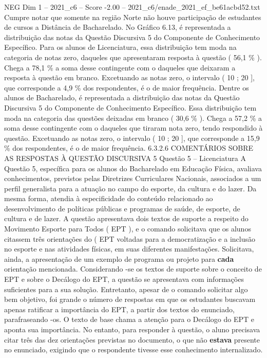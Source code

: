 \begin{textsample}{NEG Dim 1 – 2021\_c6 – Score -2.00 – 2021\_c6/enade\_2021\_ef\_be61acbd52.txt}
Cumpre notar que somente na região Norte não houve participação de estudantes de cursos a Distância de Bacharelado.
No Gráfico 6.13, é representada a distribuição das notas da Questão Discursiva 5 do Componente de Conhecimento Específico.
Para os alunos de Licenciatura, essa distribuição tem moda na categoria de notas zero, daqueles que apresentaram resposta à questão ( 56,1 \% ).
Chega a 78,1 \% a soma desse contingente com o daqueles que deixaram a resposta à questão em branco.
Excetuando as notas zero, o intervalo ( 10 ; 20 ], que corresponde a 4,9 \% dos respondentes, é o de maior frequência.
Dentre os alunos de Bacharelado, é representada a distribuição das notas da Questão Discursiva 5 do Componente de Conhecimento Específico.
Essa distribuição tem moda na categoria das questões deixadas em branco ( 30,6 \% ).
Chega a 57,2 \% a soma desse contingente com o daqueles que tiraram nota zero, tendo respondido à questão.
Excetuando as notas zero, o intervalo ( 10 ; 20 ], que corresponde a 15,9 \% dos respondentes, é o de maior frequência. 6.3.2.6 COMENTÁRIOS SOBRE AS RESPOSTAS À QUESTÃO DISCURSIVA 5 Questão 5 – Licenciatura A Questão 5, específica para os alunos do Bacharelado em Educação Física, avaliava conhecimentos, previstos pelas Diretrizes Curriculares Nacionais, associados a um perfil generalista para a atuação no campo do esporte, da cultura e do lazer.
Da mesma forma, atendia à especificidade do conteúdo relacionado ao desenvolvimento de políticas públicas e programas de saúde, de esporte, de cultura e de lazer.
A questão apresentava dois textos de suporte a respeito do Movimento Esporte para Todos ( EPT ), e o comando solicitava que os alunos citassem três orientações do ( EPT voltadas para a democratização e a inclusão no esporte e nas atividades físicas, em suas diferentes manifestações.
Solicitava, ainda, a apresentação de um exemplo de programa ou projeto para \textbf{cada} orientação mencionada.
Considerando -se os textos de suporte sobre o conceito de EPT e sobre o Decálogo do EPT, a questão se apresentava com informações suficientes para a sua solução.
Entretanto, apesar de o comando solicitar algo bem objetivo, foi grande o número de respostas em que os estudantes buscavam apenas ratificar a importância do EPT, a partir dos textos do enunciado, parafraseando -os.
O texto de base chama a atenção para o Decálogo do EPT e aponta sua importância.
No entanto, para responder à questão, o aluno precisava citar três das dez orientações previstas no documento, o que não \textbf{estava} presente no enunciado, exigindo que o respondente tivesse esse conhecimento internalizado.

\end{textsample}
